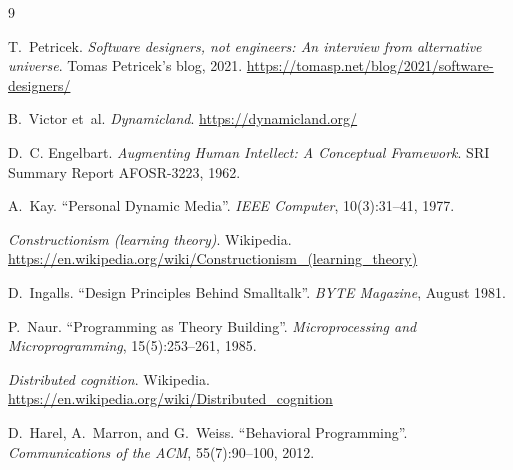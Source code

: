 \documentclass[11pt,a4paper]{article}
\begin{document}
\begin{thebibliography}{9}

T.~Petricek.
\emph{Software designers, not engineers: An interview from alternative
universe}. Tomas Petricek's blog, 2021.
\url{https://tomasp.net/blog/2021/software-designers/}

B.~Victor et~al.
\emph{Dynamicland}.
\url{https://dynamicland.org/}

D.~C. Engelbart.
\emph{Augmenting Human Intellect: A Conceptual Framework}.
SRI Summary Report AFOSR-3223, 1962.

A.~Kay.
``Personal Dynamic Media''.
\emph{IEEE Computer}, 10(3):31--41, 1977.

\emph{Constructionism (learning theory)}. Wikipedia.
\url{https://en.wikipedia.org/wiki/Constructionism_(learning_theory)}

D.~Ingalls.
``Design Principles Behind Smalltalk''.
\emph{BYTE Magazine}, August 1981.

P.~Naur.
``Programming as Theory Building''.
\emph{Microprocessing and Microprogramming}, 15(5):253--261, 1985.

\emph{Distributed cognition}. Wikipedia.
\url{https://en.wikipedia.org/wiki/Distributed_cognition}

D.~Harel, A.~Marron, and G.~Weiss.
``Behavioral Programming''.
\emph{Communications of the ACM}, 55(7):90--100, 2012.

\end{thebibliography}
\end{document}
